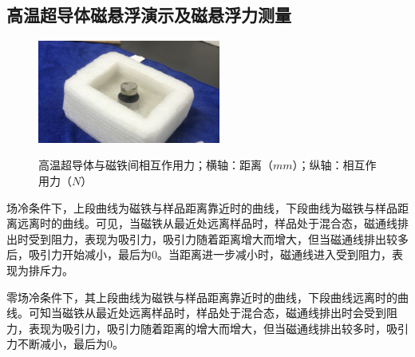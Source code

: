 \documentclass[UTF8]{ctexart}
\begin{document}
\subsection{高温超导体磁悬浮演示及磁悬浮力测量}
\begin{figure}[H]
\centering
\includegraphics[width=6cm]{float.jpg}
\end{figure}
\begin{figure}[H]
\centering
  \caption{高温超导体与磁铁间相互作用力；横轴：距离（$mm$）；纵轴：相互作用力（$N$）} 
  \label{fig:subfig} %
\end{figure}
场冷条件下，上段曲线为磁铁与样品距离靠近时的曲线，下段曲线为磁铁与样品距离远离时的曲线。可见，当磁铁从最近处远离样品时，样品处于混合态，磁通线排出时受到阻力，表现为吸引力，吸引力随着距离增大而增大，但当磁通线排出较多后，吸引力开始减小，最后为0。当距离进一步减小时，磁通线进入受到阻力，表现为排斥力。 

零场冷条件下，其上段曲线为磁铁与样品距离靠近时的曲线，下段曲线远离时的曲线。可知当磁铁从最近处远离样品时，样品处于混合态，磁通线排出时会受到阻力，表现为吸引力，吸引力随着距离的增大而增大，但当磁通线排出较多时，吸引力不断减小，最后为0。
\end{document}
